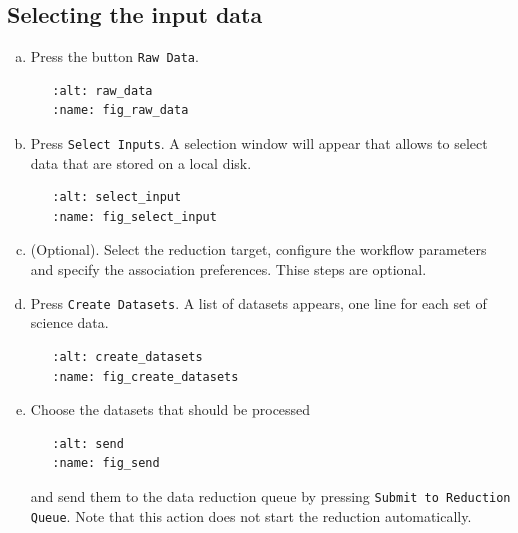 \subsection{Selecting the input data}

\begin{enumerate}[a)]
\item  Press the button \texttt{Raw Data}.
\begin{verbatim}
   :alt: raw_data
   :name: fig_raw_data
\end{verbatim}

\item  Press \texttt{Select Inputs}. A selection window will appear that allows to select data that are stored on a local disk.

\begin{verbatim}
   :alt: select_input
   :name: fig_select_input
\end{verbatim}

\item (Optional). Select the reduction target, configure the workflow parameters and specify the association preferences. 
Thise steps are optional.

\item Press \texttt{Create Datasets}. A list of datasets appears, one line for each set of science data.

\begin{verbatim}
   :alt: create_datasets
   :name: fig_create_datasets
\end{verbatim}


\item Choose the datasets that should be processed 
\begin{verbatim}
   :alt: send
   :name: fig_send
\end{verbatim}
and send them to the data reduction queue by pressing \texttt{Submit to Reduction Queue}. Note that this action does not start the 
reduction automatically.

\end{enumerate}

